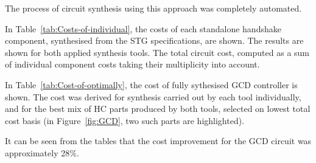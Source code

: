 The process of circuit synthesis using this approach was completely
automated.

In Table~\ref{tab:Costs-of-individual}, the costs of each standalone
handshake component, synthesised from the STG specifications, are
shown. The results are shown for both applied synthesis tools.
The total circuit cost, computed as a sum of individual component costs taking their multiplicity into account.

In Table~\ref{tab:Cost-of-optimally}, the cost of fully sythesised
GCD controller is shown. The cost was derived for synthesis carried
out by each tool individually, and for the best mix of HC parts produced
by both tools, selected on lowest total cost basis (in Figure~\ref{fig:GCD},
two such parts are highlighted).

It can be seen from the tables that the cost improvement for
the GCD circuit was approximately 28\%.
